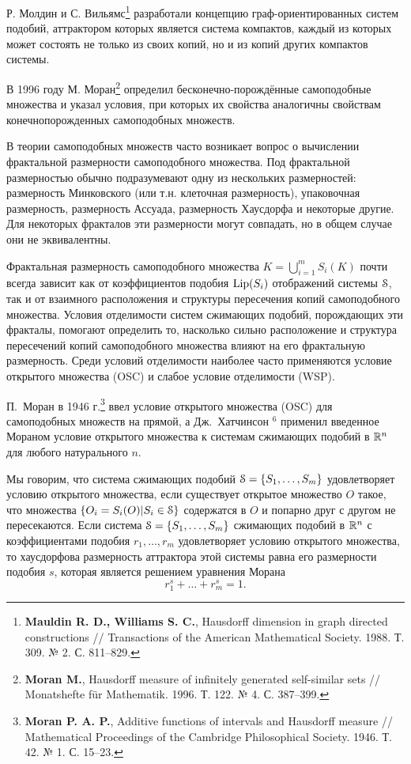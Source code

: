 \documentclass[a5paper,9pt,twoside]{extarticle} %
\begin{document}
Р. Молдин и С. Вильямс\footnote{{\bf Mauldin R. D., Williams S. C.}, Hausdorff dimension in graph directed constructions // Transactions of the American Mathematical Society. 1988. Т. 309. № 2. С. 811--829.} разработали концепцию граф-ори\-ен\-ти\-ро\-ванных систем подобий, аттрактором которых является система компактов, каждый из которых может состоять не только из своих копий, но и из копий других компактов системы.

В 1996 году М. Моран\footnote{{\bf Moran M.}, Hausdorff measure of infinitely generated self-similar sets // Monatshefte für Mathematik. 1996. Т. 122. № 4. С. 387--399.} определил бесконечно-порождённые самоподобные множества и указал условия, при которых их свойства аналогичны свойствам конечнопорожденных самоподобных множеств.

В теории самоподобных множеств часто возникает вопрос о вычислении фрактальной размерности самоподобного множества.
Под фрактальной размерностью обычно подразумевают одну из нескольких размерностей: размерность Минковского (или т.н. клеточная размерность), упаковочная размерность, размерность Ассуада, размерность Хаусдорфа и некоторые другие.
Для некоторых фракталов эти размерности могут совпадать, но в общем случае они не эквивалентны.

Фрактальная размерность самоподобного множества $K=\bigcup_{i=1}^mS_i(K)$ почти всегда зависит как от коэффициентов подобия $\mathop{\rm Lip} \nolimits(S_i)$ отображений системы ${\EuScript S}$, так и от взаимного расположения и структуры пересечения копий самоподобного множества.
Условия отделимости систем сжимающих подобий, порождающих эти фракталы, помогают определить то, насколько  сильно расположение и  структура пересечений копий самоподобного множества влияют на его фрактальную размерность.
Среди условий отделимости наиболее часто применяются условие открытого множества (OSC) и слабое условие отделимости (WSP).

П.~Моран в 1946 г.\footnote{{\bf Moran P. A. P.}, Additive functions of intervals and Hausdorff measure // Mathematical Proceedings of the Cambridge Philosophical Society. 1946. Т. 42. № 1. С. 15–23.} ввел условие открытого множества (OSC) для самоподобных множеств на прямой, а Дж.~Хатчинсон $^6$ применил введенное Мораном условие открытого множества к системам сжимающих подобий в $\mathbb{R}^n$ для любого натурального $n$.

Мы говорим, что система сжимающих подобий \linebreak ${\EuScript S}=\{S_1, \ldots, S_m\}$ удовлетворяет условию открытого множества, если существует открытое множество $O$ такое, что множества $\{O_i=S_i(O) | S_i\in{\EuScript S}\}$ содержатся в $O$ и попарно друг с другом не пересекаются.
Если система ${\EuScript S}=\{S_1,\ldots,S_m\}$ сжимающих подобий в $\mathbb{R}^n$ с коэффициентами подобия $r_1, \ldots, r_m$ удовлетворяет условию открытого множества, то хаусдорфова размерность аттрактора этой системы равна его размерности подобия $s$, которая является решением уравнения Морана 
$$r_1^s+\ldots+r_m^s=1.$$ 
\end{document}
